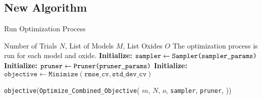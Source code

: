 \subsection{New Algorithm}
\begin{algorithm}
\caption{Run Optimization Process}
\label{alg:study_function}
\begin{algorithmic}[1]
\Require Number of Trials $N$, List of Models $M$, List Oxides $O$
\Ensure The optimization process is run for each model and oxide. 
\State \textbf{Initialize:} $\texttt{sampler} \gets \texttt{Sampler(\texttt{sampler\_params})}$ \label{step:initialize_sampler}
\State \textbf{Initialize:} $\texttt{pruner} \gets \texttt{Pruner(\texttt{pruner\_params})}$ \label{step:initialize_pruner}
\State \textbf{Initialize:} $\texttt{objective} \gets \texttt{Minimize}(\texttt{rmse\_cv}, \texttt{std\_dev\_cv})$ \label{step:initialize_objective}

 \label{step:oxide_loop}
     \label{step:model_loop}
        \State \texttt{objective}(\texttt{Optimize\_Combined\_Objective}(
        \State \hspace{1.5em} $m$,
        \State \hspace{1.5em} $N$,
        \State \hspace{1.5em} $o$,
        \State \hspace{1.5em} \texttt{sampler},
        \State \hspace{1.5em} \texttt{pruner},
        \State )) \label{step:optimize_combined_objective}
    \EndFor
\EndFor
\end{algorithmic}
\end{algorithm}

